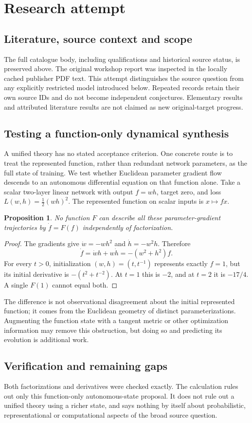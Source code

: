 \documentclass[11pt]{article}
\newtheorem{proposition}{Proposition}
\begin{document}
\section{Research attempt}
\subsection{Literature, source context and scope}
The full catalogue body, including qualifications and historical source status, is preserved above. The original workshop report was inspected in the locally cached publisher PDF text. This attempt distinguishes the source question from any explicitly restricted model introduced below. Repeated records retain their own source IDs and do not become independent conjectures. Elementary results and attributed literature results are not claimed as new original-target progress.

\subsection{Testing a function-only dynamical synthesis}
A unified theory has no stated acceptance criterion. One concrete route is to treat the represented function, rather than redundant network parameters, as the full state of training. We test whether Euclidean parameter gradient flow descends to an autonomous differential equation on that function alone.
Take a scalar two-layer linear network with output $f=wh$, target zero, and loss $L(w,h)=\tfrac12(wh)^2$. The represented function on scalar inputs is $x\mapsto fx$.
\begin{proposition}
No function $F$ can describe all these parameter-gradient trajectories by $\dot f=F(f)$ independently of factorization.
\end{proposition}
\begin{proof}
The gradients give $\dot w=-wh^2$ and $\dot h=-w^2h$. Therefore
\[
 \dot f=\dot w h+w\dot h=-(w^2+h^2)f.
\]
For every $t>0$, initialization $(w,h)=(t,t^{-1})$ represents exactly $f=1$, but its initial derivative is $-(t^2+t^{-2})$. At $t=1$ this is $-2$, and at $t=2$ it is $-17/4$. A single $F(1)$ cannot equal both.
\end{proof}
The difference is not observational disagreement about the initial represented function; it comes from the Euclidean geometry of distinct parameterizations. Augmenting the function state with a tangent metric or other optimization information may remove this obstruction, but doing so and predicting its evolution is additional work.
\subsection{Verification and remaining gaps}
Both factorizations and derivatives were checked exactly. The calculation rules out only this function-only autonomous-state proposal. It does not rule out a unified theory using a richer state, and says nothing by itself about probabilistic, representational or computational aspects of the broad source question.
\end{document}
